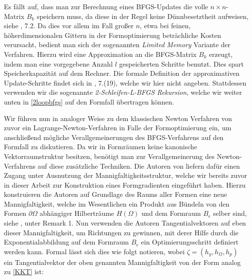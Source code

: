 Es fällt auf, dass man zur Berechnung eines BFGS-Updates die volle $n\times n$-Matrix $B_k$ speichern muss, da diese in der Regel keine Dünnbesetztheit aufweisen, siehe \cite{Nocedal}, 7.2. Da dies vor allem im Fall großer $n$, etwa bei feinen, höherdimensionalen Gittern in der Formoptimierung beträchliche Kosten verursacht, bedient man sich der sogenannten \textit{Limited Memory} Variante der Verfahren. Hierzu wird eine Approximation an die BFGS-Matrix $B_k$ erzeugt, indem man eine vorgegebene Anzahl $l$ gespeicherten Schritte benutzt. Dies spart Speicherkapazität auf dem Rechner. Die formale Definition der approximativen Update-Schritte findet sich in \cite{Nocedal}, 7.(19), welche wir hier nicht angeben. Stattdessen verwenden wir die sogenannte \textit{2-Schleifen-L-BFGS Rekursion}, welche wir weiter unten in \ref{2loopbfgs} auf den Formfall übertragen können.

Wir führen nun in analoger Weise zu dem klassischen Newton Verfahren von zuvor ein Lagrange-Newton-Verfahren in Falle der Formoptimierung ein, um anschließend mögliche Verallgemeinerungen des BFGS-Verfahrens auf den Formfall zu diskutieren.
Da wir in Formräumen keine kanonische Vektorraumstruktur besitzen, benötigt man zur Verallgemeinerung des Newton-Verfahrens auf diese zusätzliche Techniken.
Die Autoren von \cite{LagrangeNewton} liefern dafür einen Zugang unter Ausnutzung der Mannigfaltigkeitsstruktur, welche wir bereits zuvor in dieser Arbeit zur Konstruktion eines Formgradienten eingeführt haben. Hierzu konstruieren die Autoren auf Grundlage des Raums aller Formen eine neue Mannigfaltigkeit, welche im Wesentlichen ein Produkt aus Bündeln von den Formen $\partial\Omega$ abhängiger Hilberträume $H(\Omega)$ und dem Formraum $B_e$ selber sind, siehe \cite{LagrangeNewton}, unter Remark 1.  Nun verwenden die Autoren Tangentialvektoren auf eben dieser Mannigfaltigkeit, um Richtungen zu gewinnen, mit derer Hilfe durch die Exponentialabbildung auf dem Formraum $B_e$ ein Optimierungsschritt definiert werden kann. Formal lässt sich dies wie folgt notieren, wobei $\zeta = (h_y, h_{\Omega}, h_p)$ ein Tangentialvektor der oben genannten Mannigfaltigkeit von der Form analog zu \ref{KKT} ist:


